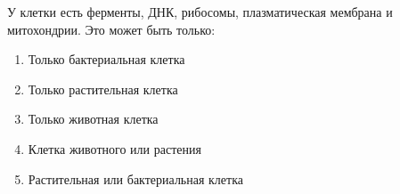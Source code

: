
У клетки есть
ферменты, ДНК, рибосомы, плазматическая мембрана и митохондрии. Это может быть
только:

\begin{enumerate}
    \item Только бактериальная клетка
    \item Только растительная клетка
    \item Только животная клетка
    \item Клетка животного или растения
    \item Растительная или бактериальная клетка
\end{enumerate}



